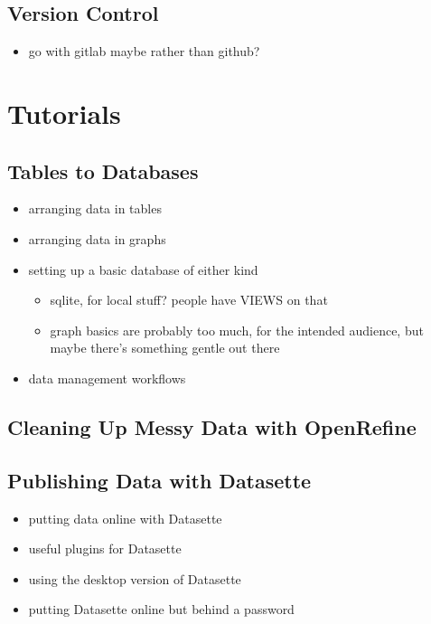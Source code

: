 \documentclass[
]{book}
\providecommand{\tightlist}{%
  \setlength{\itemsep}{0pt}\setlength{\parskip}{0pt}}
\begin{document}
\hypertarget{version-control}{%
\section{Version Control}\label{version-control}}

\begin{itemize}
\tightlist
\item
  go with gitlab maybe rather than github?
\end{itemize}

\hypertarget{tutorials}{%
\chapter{Tutorials}\label{tutorials}}

\hypertarget{data-management}{%
\section{Tables to Databases}\label{data-management}}

\begin{itemize}
\tightlist
\item
  arranging data in tables
\item
  arranging data in graphs
\item
  setting up a basic database of either kind

  \begin{itemize}
  \tightlist
  \item
    sqlite, for local stuff? people have VIEWS on that
  \item
    graph basics are probably too much, for the intended audience, but maybe there's something gentle out there
  \end{itemize}
\item
  data management workflows
\end{itemize}

\hypertarget{open-refine}{%
\section{Cleaning Up Messy Data with OpenRefine}\label{open-refine}}

\hypertarget{publishing}{%
\section{Publishing Data with Datasette}\label{publishing}}

\begin{itemize}
\tightlist
\item
  putting data online with Datasette
\item
  useful plugins for Datasette
\item
  using the desktop version of Datasette
\item
  putting Datasette online but behind a password
\end{itemize}
\end{document}
